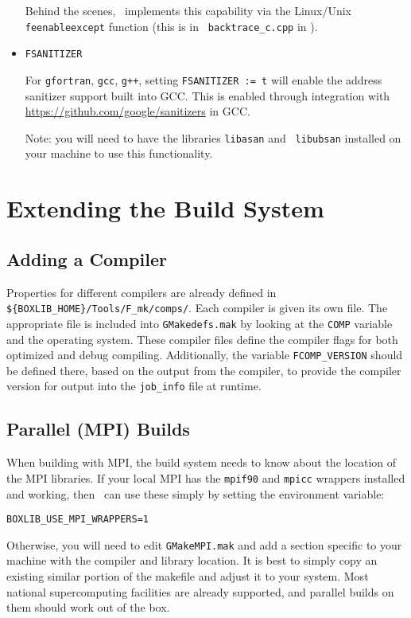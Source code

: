 \begin{itemize}
  Behind the scenes, \boxlib\ implements this capability via the
  Linux/Unix {\tt feenableexcept} function (this is in {\tt
    backtrace\_c.cpp} in \boxlib).

\item {\tt FSANITIZER}

  For {\tt gfortran}, {\tt gcc}, {\tt g++}, setting {\tt FSANITIZER :=
    t} will enable the
  address sanitizer support built into GCC.  This is enabled through
  integration with \url{https://github.com/google/sanitizers} in GCC.

  Note: you will need to have the libraries {\tt libasan} and {\tt
    libubsan} installed on your machine to use this functionality.

\end{itemize}


\section{Extending the Build System}

\subsection{Adding a Compiler}

Properties for different compilers are already defined in {\tt
  \$\{BOXLIB\_HOME\}/Tools/F\_mk/comps/}.  Each compiler is given its
own file.  The appropriate file is included into {\tt GMakedefs.mak}
by looking at the {\tt COMP} variable and the operating system.  These
compiler files define the compiler flags for both optimized and debug
compiling.  Additionally, the variable {\tt FCOMP\_VERSION} should be
defined there, based on the output from the compiler, to provide the
compiler version for output into the {\tt job\_info} file at runtime.


\subsection{Parallel (MPI) Builds}

When building with MPI, the build system needs to know about the location of the
MPI libraries.  If your local MPI has the {\tt mpif90} and {\tt mpicc} wrappers
installed and working, then \maestro\ can use these simply by setting the
environment variable:
\begin{verbatim}
BOXLIB_USE_MPI_WRAPPERS=1
\end{verbatim}
Otherwise, you will need to edit {\tt GMakeMPI.mak} and add a section
specific to your machine with the compiler and library location.  It
is best to simply copy an existing similar portion of the makefile and
adjust it to your system.  Most national supercomputing facilities are
already supported, and parallel builds on them should work out of the
box.



